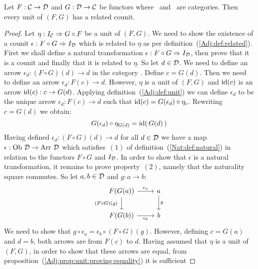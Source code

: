 \begin{prop}\label{Adj:prop:unit:has:related:counit}
    Let $F:\mbox{$\cal C$}\to\mbox{$\cal D$}$ and $G:\mbox{$\cal D$}\to\mbox{$\cal C$}$ be functors where \Cat\ and \Dat\ 
    are categories. Then every unit of $(F,G)$ has a related counit.
\end{prop}
\begin{proof}
    Let $\eta:I_{\cal C}\Rightarrow G\circ F$ be a unit of $(F,G)$. We need to 
    show the existence of a counit $\epsilon:F\circ G\Rightarrow I_{\cal D}$ 
    which is related to $\eta$ as per definition~(\ref{Adj:def:related}).
    First we shall define a natural transformation $\epsilon:F\circ G\Rightarrow
    I_{\cal D}$, then prove that it is a counit and finally that it is related
    to $\eta$. So let $d\in\mbox{$\cal D$}$. We need to define an arrow $\epsilon_{d}:
    (F\circ G)(d)\to d$ in the category \Dat. Define $c=G(d)$. Then we need
    to define an arrow $\epsilon_{d}:F(c)\to d$. However, $\eta$ is a unit
    of $(F,G)$ and $\mbox{\rm id}(c)$ is an arrow $\mbox{\rm id}(c):c\to G(d)$. Applying
    definition~(\ref{Adj:def:unit}) we can define $\epsilon_{d}$ to be
    the unique arrow $\epsilon_{d}:F(c)\to d$ such that $\mbox{\rm id}(c)=G(\epsilon_{d})
    \circ\eta_{c}$. Rewriting $c=G(d)$ we obtain:
        \begin{equation}\label{Adj:eqn:unit:has:related:counit:1}
            G(\epsilon_{d})\circ\eta_{G(d)}=\mbox{\rm id}(\,G(d)\,)
        \end{equation}
    Having defined $\epsilon_{d}:(F\circ G)(d)\to d$ for all $d\in\mbox{$\cal D$}$ we have 
    a map $\epsilon:\mbox{\rm Ob}\ \mbox{$\cal D$}\to\mbox{\rm Arr}\ \mbox{$\cal D$}$ which satisfies~$(1)$ of 
    definition~(\ref{Nat:def:natural}) in relation to the functors $F\circ G$
    and $I_{\cal D}$. In order to show that $\epsilon$ is a natural 
    transformation, it remains to prove property~$(2)$, namely that the 
    naturality square commutes. So let $a,b\in\mbox{$\cal D$}$ and $g:a\to b$:
    \[
        \begin{tikzcd}
            F(G(a))\arrow[r, "\epsilon_{a}"]\arrow[d, swap,"(F\circ G)(g)\ "]
            &a\arrow[d, "g"]
            \\
            F(G(b))\arrow[r, swap, "\epsilon_{b}"]
            &b
        \end{tikzcd}
    \]
    We need to show that $g\circ\epsilon_{a}=\epsilon_{b}\circ(F\circ G)(g)$.
    However, defining $c=G(a)$ and $d=b$, both arrows are from $F(c)$ to $d$.
    Having assumed that $\eta$ is a unit of $(F,G)$, in order to show that
    these arrows are equal, 
    from proposition~(\ref{Adj:prop:unit:proving:equality}) it is sufficient

\end{proof}
